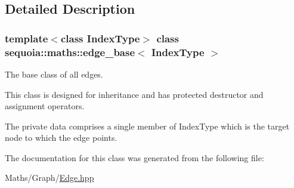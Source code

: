 \subsection{Detailed Description}
\subsubsection*{template$<$class Index\+Type$>$\newline
class sequoia\+::maths\+::edge\+\_\+base$<$ Index\+Type $>$}

The base class of all edges. 

This class is designed for inheritance and has protected destructor and assignment operators.

The private data comprises a single member of Index\+Type which is the \textquotesingle{}target node\textquotesingle{} to which the edge points. 

The documentation for this class was generated from the following file\+:\begin{DoxyCompactItemize}
\item 
Maths/\+Graph/\mbox{\hyperlink{_edge_8hpp}{Edge.\+hpp}}\end{DoxyCompactItemize}
